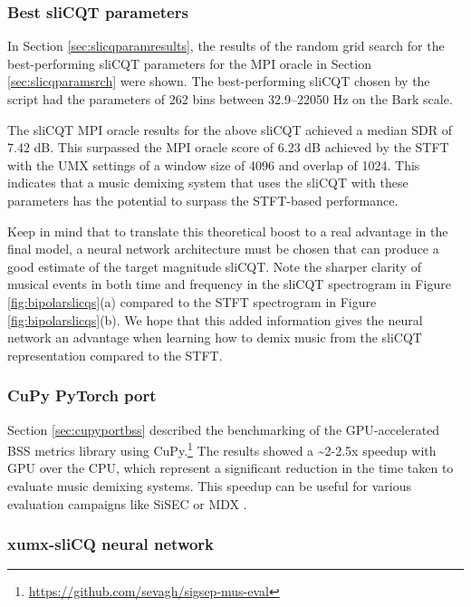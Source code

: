 \documentclass[report.tex]{subfiles}
\begin{document}
\subsubsection{Best sliCQT parameters}
\label{sec:slicqparamresultsdiscuss}

In Section \ref{sec:slicqparamresults}, the results of the random grid search for the best-performing sliCQT parameters for the MPI oracle in Section \ref{sec:slicqparamsrch} were shown. The best-performing sliCQT chosen by the script had the parameters of 262 bins between 32.9--22050 Hz on the Bark scale.

The sliCQT MPI oracle results for the above sliCQT achieved a median SDR of 7.42 dB. This surpassed the MPI oracle score of 6.23 dB achieved by the STFT with the UMX settings of a window size of 4096 and overlap of 1024. This indicates that a music demixing system that uses the sliCQT with these parameters has the potential to surpass the STFT-based performance.

Keep in mind that to translate this theoretical boost to a real advantage in the final model, a neural network architecture must be chosen that can produce a good estimate of the target magnitude sliCQT. Note the sharper clarity of musical events in both time and frequency in the sliCQT spectrogram in Figure \ref{fig:bipolarslicqs}(a) compared to the STFT spectrogram in Figure \ref{fig:bipolarslicqs}(b). We hope that this added information gives the neural network an advantage when learning how to demix music from the sliCQT representation compared to the STFT.

\subsubsection{CuPy PyTorch port}
\label{sec:cupyportbssdiscuss}

Section \ref{sec:cupyportbss} described the benchmarking of the GPU-accelerated BSS metrics library using CuPy.\footnote{\url{https://github.com/sevagh/sigsep-mus-eval}} The results showed a \textasciitilde2-2.5x speedup with GPU over the CPU, which represent a significant reduction in the time taken to evaluate music demixing systems. This speedup can be useful for various evaluation campaigns like SiSEC \parencite{sisec2018} or MDX \parencite{mdx21}.

\subsubsection{xumx-sliCQ neural network}
\label{sec:netdiscuss}
\end{document}
